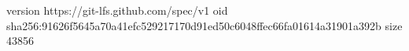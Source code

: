 version https://git-lfs.github.com/spec/v1
oid sha256:91626f5645a70a41efc529217170d91ed50c6048ffec66fa01614a31901a392b
size 43856
